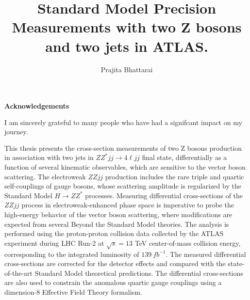 \documentclass[red]{brandeis-dissertation}
\title{Standard Model Precision Measurements with two Z bosons and two jets in ATLAS.}
\author{Prajita Bhattarai}
\numberwithin{equation}{section}
\begin{document}
\maketitlepage
\clearpage
\makeapproval
\clearpage
\makecopyright
\clearpage
\begin{center}
\textbf{\large{Acknowledgements}}
\end{center}
I am sincerely grateful to many people who have had a signifcant impact on my  journey. 
\clearpage


\begin{dissertation-abstract}
This thesis presents the cross-section measurements of two Z bosons production in association with two jets in $ZZ^*jj\rightarrow 4 \ell jj$ final state, differentially as a function of several kinematic observables, which are sensitive to the vector boson scattering. The electroweak $ZZjj$ production includes the rare triple and quartic self-couplings of gauge bosons, whose scattering amplitude is regularized by the Standard Model $H\rightarrow ZZ^{*}$ processes. Measuring differential cross-sections of the $ZZjj$ process in electroweak-enhanced phase space is imperative to probe the high-energy behavior of the vector boson scattering, where modifications are expected from several Beyond the Standard Model theories. The analysis is performed using the proton-proton collision data collected by the ATLAS experiment during LHC Run-2 at $\sqrt{s}=13$ TeV center-of-mass collision energy, corresponding to the integrated luminosity of $139~fb^{-1}$. The measured differential cross-sections are corrected for the detector effects and compared with the state-of-the-art Standard Model theoretical predictions. The differential cross-sections are also used to constrain the anomalous quartic gauge couplings using a dimension-8 Effective Field Theory formalism. 

\end{dissertation-abstract}
\clearpage

\doublespacing

\tableofcontents
\clearpage
{}
{}
\listoftables
\clearpage
{}
{}
\listoffigures
\clearpage


\clearpage


\startbody

\renewcommand{\partname}{Chapter}
\end{document}
